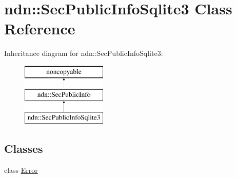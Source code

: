 \hypertarget{classndn_1_1SecPublicInfoSqlite3}{}\section{ndn\+:\+:Sec\+Public\+Info\+Sqlite3 Class Reference}
\label{classndn_1_1SecPublicInfoSqlite3}
Inheritance diagram for ndn\+:\+:Sec\+Public\+Info\+Sqlite3\+:\begin{figure}[H]
\begin{center}
\leavevmode
\includegraphics[height=3.000000cm]{classndn_1_1SecPublicInfoSqlite3}
\end{center}
\end{figure}
\subsection*{Classes}
\begin{DoxyCompactItemize}
\item 
class \hyperlink{classndn_1_1SecPublicInfoSqlite3_1_1Error}{Error}
\end{DoxyCompactItemize}
